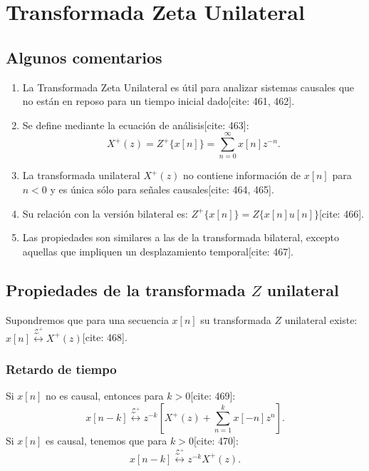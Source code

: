 \section{Transformada Zeta Unilateral}

\subsection{Algunos comentarios}
\begin{enumerate}
	\item La Transformada Zeta Unilateral es \'{u}til para analizar sistemas causales que no est\'{a}n en reposo para un tiempo inicial dado[cite: 461, 462].
	\item Se define mediante la ecuaci\'{o}n de an\'{a}lisis[cite: 463]:
	\begin{equation}
		X^{+}(z) = Z^{+}\{x[n]\} = \sum_{n=0}^{\infty} x[n] z^{-n}.
	\end{equation}
	\item La transformada unilateral $X^{+}(z)$ no contiene informaci\'{o}n de $x[n]$ para $n<0$ y es \'{u}nica s\'{o}lo para se\~{n}ales causales[cite: 464, 465].
	\item Su relación con la versión bilateral es: $Z^{+}\{x[n]\} = Z\{x[n] u[n]\}$[cite: 466].
	\item Las propiedades son similares a las de la transformada bilateral, excepto aquellas que impliquen un desplazamiento temporal[cite: 467].
\end{enumerate}

\subsection{Propiedades de la transformada $Z$ unilateral}
Supondremos que para una secuencia $x[n]$ su transformada $Z$ unilateral existe: $x[n] \stackrel{\mathcal{Z}^+}{\longleftrightarrow} X^{+}(z)$[cite: 468].

\subsubsection{Retardo de tiempo}
Si $x[n]$ no es causal, entonces para $k > 0$[cite: 469]:
\begin{equation}
	x[n-k] \stackrel{\mathcal{Z}^+}{\longleftrightarrow} z^{-k} \left[ X^{+}(z) + \sum_{n=1}^{k} x[-n] z^{n} \right].
\end{equation}
Si $x[n]$ es causal, tenemos que para $k > 0$[cite: 470]:
\begin{equation}
	x[n-k] \stackrel{\mathcal{Z}^+}{\longleftrightarrow} z^{-k} X^{+}(z).
\end{equation}

